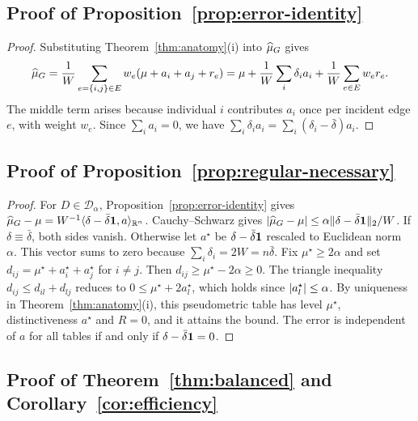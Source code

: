 \subsection{Proof of Proposition~\ref{prop:error-identity}}

\begin{proof}
Substituting Theorem~\ref{thm:anatomy}(i) into $\widehat{\mu}_{G}$ gives
\[
\widehat{\mu}_{G}=\frac1W\sum_{e=\{i,j\}\in E}w_e(\mu+a_i+a_j+r_e)
=\mu+\frac1W\sum_{i}\delta_i a_i+\frac1W\sum_{e\in E}w_e r_e .
\]
The middle term arises because individual $i$ contributes $a_i$ once per incident edge $e$,
with weight $w_e$. Since $\sum_ia_i=0$, we have
$\sum_i\delta_ia_i=\sum_i(\delta_i-\bar\delta)a_i$.
\end{proof}

\subsection{Proof of Proposition~\ref{prop:regular-necessary}}

\begin{proof}
For $D\in\mathcal D_\alpha$, Proposition~\ref{prop:error-identity} gives
$\widehat{\mu}_{G}-\mu=W^{-1}\langle\delta-\bar\delta\mathbf{1},a\rangle_{\mathbb{R}^n}$. Cauchy--Schwarz
gives $\lvert\widehat{\mu}_{G}-\mu\rvert\le\alpha\lVert\delta-\bar\delta\mathbf{1}\rVert_2/W$. If
$\delta\equiv\bar\delta$, both sides vanish. Otherwise let $a^\star$ be
$\delta-\bar\delta\mathbf{1}$ rescaled to Euclidean norm~$\alpha$. This vector
sums to zero because $\sum_i\delta_i=2W=n\bar\delta$. Fix $\mu^\star\ge2\alpha$ and
set $d_{ij}=\mu^\star+a^\star_i+a^\star_j$ for $i\neq j$. Then
$d_{ij}\ge\mu^\star-2\alpha\ge0$. The triangle inequality $d_{ij}\le d_{il}+d_{lj}$
reduces to $0\le\mu^\star+2a^\star_l$, which holds since
$\lvert a^\star_l\rvert\le\alpha$. By uniqueness in Theorem~\ref{thm:anatomy}(i), this
pseudometric table has level $\mu^\star$, distinctiveness $a^\star$ and $R=0$, and
it attains the bound. The error is independent of $a$ for all tables if and only if
$\delta-\bar\delta\mathbf{1}=0$.
\end{proof}

\subsection{Proof of Theorem~\ref{thm:balanced} and Corollary~\ref{cor:efficiency}}
\label{app:balanced}

